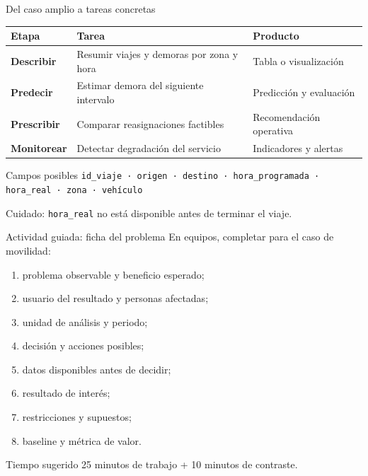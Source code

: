 \documentclass[aspectratio=169,11pt]{beamer}
\begin{document}
\begin{frame}{Del caso amplio a tareas concretas}
  \scriptsize
  \begin{tabularx}{\textwidth}{>{\bfseries}p{} X X}
    \toprule
    Etapa & Tarea & Producto \\
    \midrule
    Describir & Resumir viajes y demoras por zona y hora & Tabla o visualización \\
    Predecir & Estimar demora del siguiente intervalo & Predicción y evaluación \\
    Prescribir & Comparar reasignaciones factibles & Recomendación operativa \\
    Monitorear & Detectar degradación del servicio & Indicadores y alertas \\
    \bottomrule
  \end{tabularx}
  \vspace{0.5em}
  \begin{block}{Campos posibles}
    \texttt{id\_viaje · origen · destino · hora\_programada · hora\_real · zona · vehículo}
  \end{block}
  \centering\alert{Cuidado: \texttt{hora\_real} no está disponible antes de terminar el viaje.}
\end{frame}

\begin{frame}{Actividad guiada: ficha del problema}
  \small
  En equipos, completar para el caso de movilidad:
  \begin{enumerate}
    \item problema observable y beneficio esperado;
    \item usuario del resultado y personas afectadas;
    \item unidad de análisis y periodo;
    \item decisión y acciones posibles;
    \item datos disponibles antes de decidir;
    \item resultado de interés;
    \item restricciones y supuestos;
    \item baseline y métrica de valor.
  \end{enumerate}
  \begin{block}{Tiempo sugerido}
    25 minutos de trabajo + 10 minutos de contraste.
  \end{block}
\end{frame}
\end{document}
